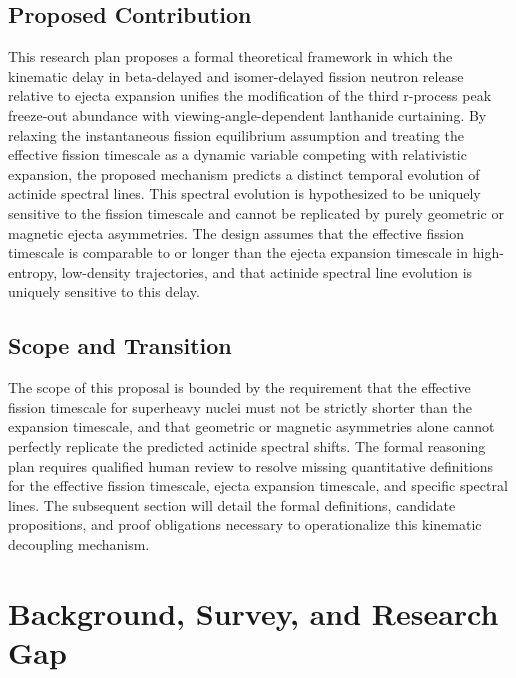 \documentclass[conference]{IEEEtran}
\begin{document}
\subsection{Proposed Contribution}
This research plan proposes a formal theoretical framework in which the kinematic delay in beta-delayed and isomer-delayed fission neutron release relative to ejecta expansion unifies the modification of the third r-process peak freeze-out abundance with viewing-angle-dependent lanthanide curtaining. By relaxing the instantaneous fission equilibrium assumption and treating the effective fission timescale as a dynamic variable competing with relativistic expansion, the proposed mechanism predicts a distinct temporal evolution of actinide spectral lines. This spectral evolution is hypothesized to be uniquely sensitive to the fission timescale and cannot be replicated by purely geometric or magnetic ejecta asymmetries. The design assumes that the effective fission timescale is comparable to or longer than the ejecta expansion timescale in high-entropy, low-density trajectories, and that actinide spectral line evolution is uniquely sensitive to this delay.

\subsection{Scope and Transition}
The scope of this proposal is bounded by the requirement that the effective fission timescale for superheavy nuclei must not be strictly shorter than the expansion timescale, and that geometric or magnetic asymmetries alone cannot perfectly replicate the predicted actinide spectral shifts. The formal reasoning plan requires qualified human review to resolve missing quantitative definitions for the effective fission timescale, ejecta expansion timescale, and specific spectral lines. The subsequent section will detail the formal definitions, candidate propositions, and proof obligations necessary to operationalize this kinematic decoupling mechanism.

\section{Background, Survey, and Research Gap}
\end{document}

